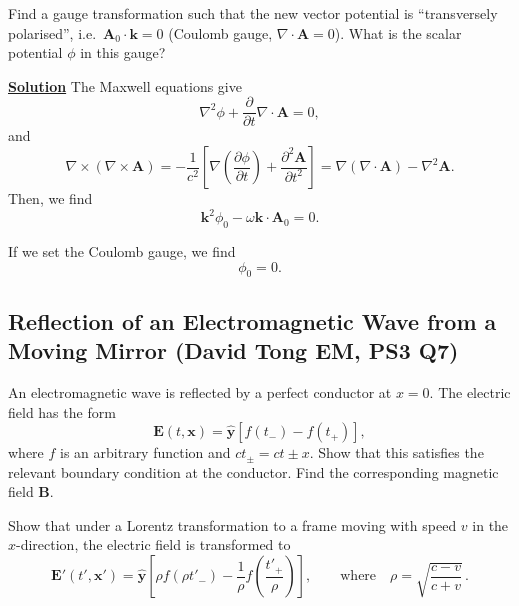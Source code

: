 Find a gauge transformation such that the new vector potential is
``transversely polarised'', i.e.\ $\mathbf{A}_0\cdot\mathbf{k}=0$ (Coulomb
gauge, $\nabla\cdot\mathbf{A}=0$). What is the scalar potential $\phi$ in
this gauge?

\noindent \underline{\textbf{Solution}} The Maxwell equations give
\begin{equation}
    \nabla^2\phi +\frac{\partial}{\partial t}\nabla\cdot \mathbf{A} =0,
\end{equation}
and
\begin{equation}
    \nabla\times(\nabla\times\mathbf{A}) = -\frac{1}{c^2}\left[\nabla\left(\frac{\partial \phi}{\partial t}\right) + \frac{\partial^2\mathbf{A}}{\partial t^2}\right] = \nabla(\nabla\cdot \mathbf{A})-\nabla^2\mathbf{A}.
\end{equation}
Then, we find
\begin{equation}
    \mathbf{k}^2 \phi_0 - \omega\mathbf{k}\cdot \mathbf{A}_0 = 0.
\end{equation}

If we set the Coulomb gauge, we find
\begin{equation}
    \phi_0 = 0.
\end{equation}

\subsection{Reflection of an Electromagnetic Wave from a Moving Mirror (David Tong EM, PS3 Q7)}
\label{sec:moving-mirror}

An electromagnetic wave is reflected by a perfect conductor at
$x=0$. The electric field has the form
\begin{equation}
  \mathbf{E}(t,\mathbf{x}) = \hat{\mathbf{y}}\left[f(t_-) - f(t_+)\right],
    \label{eq:E}
\end{equation}
where $f$ is an arbitrary function and $ct_\pm = ct\pm x$. Show that this
satisfies the relevant boundary condition at the conductor. Find the
corresponding magnetic field $\mathbf{B}$.

Show that under a Lorentz transformation to a frame moving with speed $v$ in
the $x$-direction, the electric field is transformed to
\begin{equation}
  \mathbf{E}'(t',\mathbf{x}') = \hat{\mathbf{y}}\left[
    \rho f(\rho t'_-) - \frac{1}{\rho}f\!\left(\frac{t'_+}{\rho}\right)
  \right],
  \qquad\text{where}\quad
  \rho = \sqrt{\frac{c-v}{c+v}}\,.
\end{equation}

